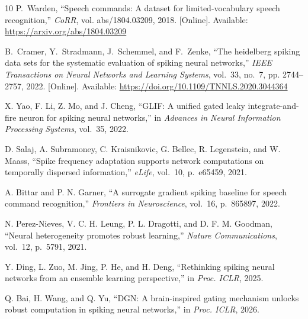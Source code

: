 \documentclass[letterpaper,journal]{IEEEtran}
\begin{document}
\begin{thebibliography}{10}
\BIBentryALTinterwordspacing
P.~Warden, ``Speech commands: A dataset for limited-vocabulary speech
  recognition,'' \emph{CoRR}, vol. abs/1804.03209, 2018. [Online]. Available:
  \url{https://arxiv.org/abs/1804.03209}
\BIBentrySTDinterwordspacing

\BIBentryALTinterwordspacing
B.~Cramer, Y.~Stradmann, J.~Schemmel, and F.~Zenke, ``The heidelberg spiking
  data sets for the systematic evaluation of spiking neural networks,''
  \emph{IEEE Transactions on Neural Networks and Learning Systems}, vol.~33,
  no.~7, pp. 2744--2757, 2022. [Online]. Available:
  \url{https://doi.org/10.1109/TNNLS.2020.3044364}
\BIBentrySTDinterwordspacing

X. Yao, F. Li, Z. Mo, and J. Cheng, ``GLIF: A unified gated leaky integrate-and-fire neuron for spiking neural networks,'' in \emph{Advances in Neural Information Processing Systems}, vol.~35, 2022.

D. Salaj, A. Subramoney, C. Kraisnikovic, G. Bellec, R. Legenstein, and W. Maass, ``Spike frequency adaptation supports network computations on temporally dispersed information,'' \emph{eLife}, vol.~10, p.~e65459, 2021.

A. Bittar and P. N. Garner, ``A surrogate gradient spiking baseline for speech command recognition,'' \emph{Frontiers in Neuroscience}, vol.~16, p.~865897, 2022.

N. Perez-Nieves, V. C. H. Leung, P. L. Dragotti, and D. F. M. Goodman, ``Neural heterogeneity promotes robust learning,'' \emph{Nature Communications}, vol.~12, p.~5791, 2021.

Y. Ding, L. Zuo, M. Jing, P. He, and H. Deng, ``Rethinking spiking neural networks from an ensemble learning perspective,'' in \emph{Proc. ICLR}, 2025.

Q. Bai, H. Wang, and Q. Yu, ``DGN: A brain-inspired gating mechanism unlocks robust computation in spiking neural networks,'' in \emph{Proc. ICLR}, 2026.

\end{thebibliography}
\end{document}
